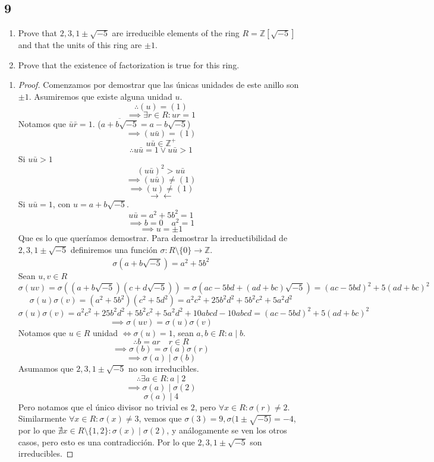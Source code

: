 \documentclass[11pt]{article}
\newcommand{\set}[1]{\mathbb{#1}}
\newcommand{\func}[5]{#1:#2\xrightarrow[#5]{#4}#3}
\newcommand{\contr}{\rightarrow\leftarrow}
\theoremstyle{definition}
\begin{document}
    \subsection{9}
    \begin{enumerate}[label=\textbf{(\alph*)}]
        \item Prove that $2,3,1\pm\sqrt{-5}$ are irreducible elements of the ring $R=\set{Z}[\sqrt{-5}]$ and that the units of this ring are $\pm 1$.

        \item Prove that the existence of factorization is true for this ring.
    \end{enumerate}
    \begin{enumerate}[label=\textbf{(\alph*)}]
        \item \begin{proof}
            Comenzamos por demostrar que las únicas unidades de este anillo son $\pm1$. Asumiremos que existe alguna unidad $u$.
            \[\therefore (u)=(1)\]
            \[\implies \exists r\in R: ur=1\]
            Notamos que $\bar{u}\bar{r}=1$. ($\overline{a+b\sqrt{-5}}=a-b\sqrt{-5}$)
            \[\implies (u\bar{u})=(1)\]
            \[u\bar{u}\in\set{Z}^+\]
            \[\therefore u\bar{u}=1\vee u\bar{u}>1\]
            Si $u\bar{u}>1$
            \[(u\bar{u})^2>u\bar{u}\]
            \[\implies (u\bar{u})\neq(1)\]
            \[\implies (u)\neq(1)\]
            \[\contr\]
            Si $u\bar{u}=1$, con $u=a+b\sqrt{-5}$.
            \[u\bar{u}=a^2+5b^2=1\]
            \[\implies b=0\quad a^2=1\]
            \[\implies u=\pm1\]
            Que es lo que queríamos demostrar. Para demostrar la irreductibilidad de $2,3,1\pm\sqrt{-5}$ definiremos una función $\func{\sigma}{R\setminus\{0\}}{\set{Z}}{}{}$.
            \[\sigma(a+b\sqrt{-5})=a^2+5b^2\]
            Sean $u,v\in R$
            \[\sigma(uv)=\sigma((a+b\sqrt{-5})(c+d\sqrt{-5}))=\sigma(ac-5bd+(ad+bc)\sqrt{-5})=(ac-5bd)^2+5(ad+bc)^2\]
            \[\sigma(u)\sigma(v)=(a^2+5b^2)(c^2+5d^2)=a^2c^2+25b^2d^2+5b^2c^2+5a^2d^2\]
            \[\sigma(u)\sigma(v)=a^2c^2+25b^2d^2+5b^2c^2+5a^2d^2+10abcd-10abcd=(ac-5bd)^2+5(ad+bc)^2\]
            \[\implies\sigma(uv)=\sigma(u)\sigma(v)\]
            Notamos que $u\in R$ unidad $\iff\sigma(u)=1$, sean $a,b\in R: a\mid b$.
            \[\therefore b=ar\quad r\in R\]
            \[\implies \sigma(b)=\sigma(a)\sigma(r)\]
            \[\implies \sigma(a)\mid\sigma(b)\]
            Asumamos que $2,3,1\pm\sqrt{-5}$ no son irreducibles.
            \[\therefore \exists a\in R: a\mid 2\]
            \[\implies\sigma(a)\mid\sigma(2)\]
            \[\sigma(a)\mid 4\]
            Pero notamos que el único divisor no trivial es $2$, pero $\forall x\in R:\sigma(r)\neq 2$. Similarmente $\forall x\in R:\sigma(x)\neq 3$, vemos que $\sigma(3)=9,\sigma(1\pm\sqrt{-5)}=-4$, por lo que $\nexists x\in R\setminus\{1,2\}:\sigma(x)\mid \sigma(2)$, y análogamente se ven los otros casos, pero esto es una contradicción. Por lo que $2,3,1\pm\sqrt{-5}$ son irreducibles.
        \end{proof}


\end{enumerate}
\end{document}
